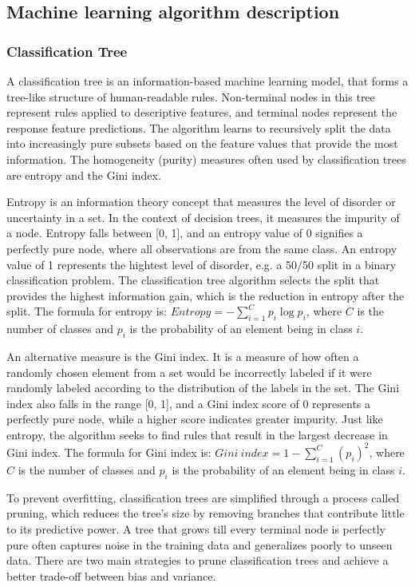\documentclass[conference]{IEEEtran}
\begin{document}
\subsection{\textbf{Machine learning algorithm description}}

\subsubsection{\textbf{Classification Tree}}

A classification tree is an information-based machine learning model, that forms a tree-like structure of human-readable rules. Non-terminal nodes in this tree represent rules applied to descriptive features, and terminal nodes represent the response feature predictions. The algorithm learns to recursively split the data into increasingly pure subsets based on the feature values that provide the most information. The homogeneity (purity) measures often used by classification trees are entropy and the Gini index.

Entropy is an information theory concept that measures the level of disorder or uncertainty in a set. In the context of decision trees, it measures the impurity of a node. Entropy falls between [0, 1], and an entropy value of 0 signifies a perfectly pure node, where all observations are from the same class. An entropy value of 1 represents the hightest level of disorder, e.g. a 50/50 split in a binary classification problem. The classification tree algorithm selects the split that provides the highest information gain, which is the reduction in entropy after the split. The formula for entropy is: $Entropy = -\sum_{i=1}^{C} p_i \log p_i$, where $C$ is the number of classes and $p_i$ is the probability of an element being in class $i$.

An alternative measure is the Gini index. It is a measure of how often a randomly chosen element from a set would be incorrectly labeled if it were randomly labeled according to the distribution of the labels in the set. The Gini index also falls in the range [0, 1], and a Gini index score of 0 represents a perfectly pure node, while a higher score indicates greater impurity. Just like entropy, the algorithm seeks to find rules that result in the largest decrease in Gini index. The formula for Gini index is: $Gini\ index = 1 - \sum_{i=1}^{C} (p_i)^2$, where $C$ is the number of classes and $p_i$ is the probability of an element being in class $i$.

To prevent overfitting, classification trees are simplified through a process called pruning, which reduces the tree's size by removing branches that contribute little to its predictive power. A tree that grows till every terminal node is perfectly pure often captures noise in the training data and generalizes poorly to unseen data. There are two main strategies to prune classification trees and achieve a better trade-off between bias and variance.
\end{document}

